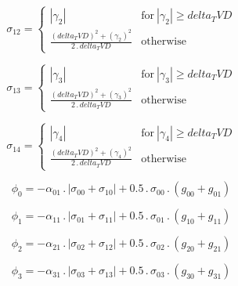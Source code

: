 \documentclass{article}
\begin{document}
\begin{dmath}\sigma_{1 2} = \begin{cases} \left|{\gamma_{2}}\right| & \text{for}\: \left|{\gamma_{2}}\right| \geq delta_TVD \\\frac{\left(delta_TVD \right)^{2} + \left(\gamma_{2} \right)^{2}}{2 \,.\, delta_TVD} & \text{otherwise} 
\end{cases}\end{dmath}

\begin{dmath}\sigma_{1 3} = \begin{cases} \left|{\gamma_{3}}\right| & \text{for}\: \left|{\gamma_{3}}\right| \geq delta_TVD \\\frac{\left(delta_TVD \right)^{2} + \left(\gamma_{3} \right)^{2}}{2 \,.\, delta_TVD} & \text{otherwise} 
\end{cases}\end{dmath}

\begin{dmath}\sigma_{1 4} = \begin{cases} \left|{\gamma_{4}}\right| & \text{for}\: \left|{\gamma_{4}}\right| \geq delta_TVD \\\frac{\left(delta_TVD \right)^{2} + \left(\gamma_{4} \right)^{2}}{2 \,.\, delta_TVD} & \text{otherwise} 
\end{cases}\end{dmath}

\begin{dmath}\phi_{0} = - \alpha_{01} \,.\, \left|{\sigma_{0 0} + \sigma_{1 0}}\right| + 0.5 \,.\, \sigma_{0 0} \,.\, \left(g_{00} + g_{01}\right)\end{dmath}

\begin{dmath}\phi_{1} = - \alpha_{11} \,.\, \left|{\sigma_{0 1} + \sigma_{1 1}}\right| + 0.5 \,.\, \sigma_{0 1} \,.\, \left(g_{10} + g_{11}\right)\end{dmath}

\begin{dmath}\phi_{2} = - \alpha_{21} \,.\, \left|{\sigma_{0 2} + \sigma_{1 2}}\right| + 0.5 \,.\, \sigma_{0 2} \,.\, \left(g_{20} + g_{21}\right)\end{dmath}

\begin{dmath}\phi_{3} = - \alpha_{31} \,.\, \left|{\sigma_{0 3} + \sigma_{1 3}}\right| + 0.5 \,.\, \sigma_{0 3} \,.\, \left(g_{30} + g_{31}\right)\end{dmath}
\end{document}
